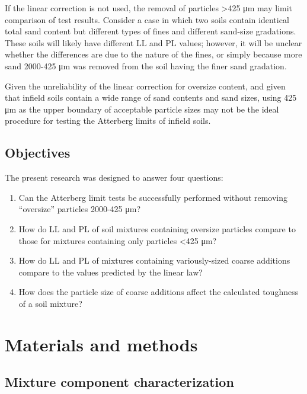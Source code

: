 \documentclass[
  letterpaper,
]{article}
\begin{document}
If the linear correction is not used, the removal of particles \textgreater425 μm may limit comparison of test results.
Consider a case in which two soils contain identical total sand content but different types of fines and different sand-size gradations.
These soils will likely have different LL and PL values; however, it will be unclear whether the differences are due to the nature of the fines, or simply because more sand 2000-425 μm was removed from the soil having the finer sand gradation.

Given the unreliability of the linear correction for oversize content, and given that infield soils contain a wide range of sand contents and sand sizes, using 425 μm as the upper boundary of acceptable particle sizes may not be the ideal procedure for testing the Atterberg limits of infield soils.

\hypertarget{objectives}{%
\subsection{Objectives}\label{objectives}}

The present research was designed to answer four questions:

\begin{enumerate}
\def\labelenumi{\arabic{enumi}.}
\item
  Can the Atterberg limit tests be successfully performed without removing ``oversize'' particles 2000-425 μm?
\item
  How do LL and PL of soil mixtures containing oversize particles compare to those for mixtures containing only particles \textless425 μm?
\item
  How do LL and PL of mixtures containing variously-sized coarse additions compare to the values predicted by the linear law?
\item
  How does the particle size of coarse additions affect the calculated toughness of a soil mixture?
\end{enumerate}

\hypertarget{materials-and-methods}{%
\section{Materials and methods}\label{materials-and-methods}}

\hypertarget{mixture-component-characterization}{%
\subsection{Mixture component characterization}\label{mixture-component-characterization}}
\end{document}
